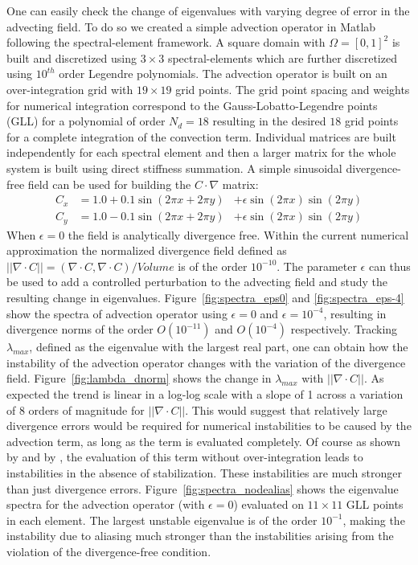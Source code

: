 One can easily check the change of eigenvalues with varying degree of error in the advecting field. To do so we created a simple advection operator in Matlab following the spectral-element framework. A square domain with $\Omega=[0,1]^{2}$ is built and discretized using $3\times3$ spectral-elements which are further discretized using $10^{th}$ order Legendre polynomials. The advection operator is built on an over-integration grid with $19\times19$ grid points. The grid point spacing and weights for numerical integration correspond to the Gauss-Lobatto-Legendre points (GLL) for a polynomial of order $N_{d}=18$ resulting in the desired $18$ grid points for a complete integration of the convection term. Individual matrices are built independently for each spectral element and then a larger matrix for the whole system is built using direct stiffness summation. A simple sinusoidal divergence-free field can be used for building the $C\cdot\nabla$ matrix:
\begin{align}
\label{eqn:convection_op}
C_{x} &= 1.0 + 0.1\sin(2\pi x + 2\pi y) &+\epsilon\sin(2\pi x)\sin(2\pi y) \\
C_{y} &= 1.0 - 0.1\sin(2\pi x + 2\pi y) &+\epsilon\sin(2\pi x)\sin(2\pi y) \nonumber
\end{align}
When $\epsilon=0$ the field is analytically divergence free. Within the current numerical approximation the normalized divergence field defined as $||\nabla\cdot C|| = (\nabla\cdot C,\nabla\cdot C)/Volume$ is of the order $10^{-10}$. The parameter $\epsilon$ can thus be used to add a controlled perturbation to the advecting field and study the resulting change in eigenvalues. Figure~\ref{fig:spectra_eps0} and \ref{fig:spectra_eps-4} show the spectra of advection operator using $\epsilon=0$ and $\epsilon=10^{-4}$, resulting in divergence norms of the order $O(10^{-11})$ and $O(10^{-4})$ respectively. Tracking $\lambda_{max}$, defined as the eigenvalue with the largest real part, one can obtain how the instability of the advection operator changes with the variation of the divergence field. Figure~\ref{fig:lambda_dnorm} shows the change in $\lambda_{max}$ with $||\nabla\cdot C||$. As expected the trend is linear in a log-log scale with a slope of 1 across a variation of 8 orders of magnitude for $||\nabla\cdot C||$. This would suggest that relatively large divergence errors would be required for numerical instabilities to be caused by the advection term, as long as the term is evaluated completely. Of course as shown by \cite{malm13} and by \cite{kirby03}, the evaluation of this term without over-integration leads to instabilities in the absence of stabilization. These instabilities are much stronger than just divergence errors. Figure~\ref{fig:spectra_nodealias} shows the eigenvalue spectra for the advection operator (with $\epsilon=0$) evaluated on $11\times11$ GLL points in each element. The largest unstable eigenvalue is of the order $10^{-1}$, making the instability due to aliasing much stronger than the instabilities arising from the violation of the divergence-free condition.
